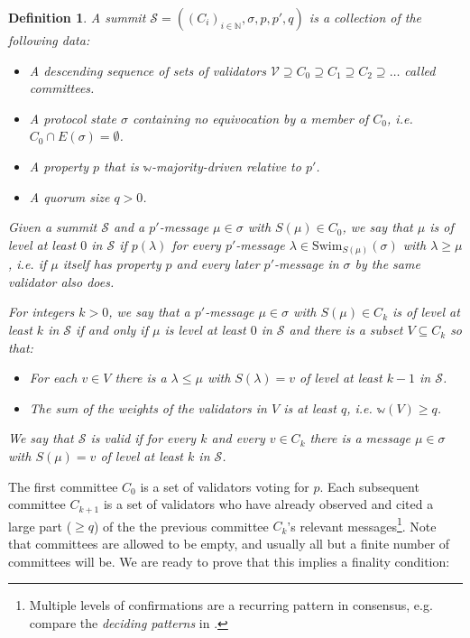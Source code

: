 \documentclass[12pt]{article}
\newtheorem{definition}{Definition}
\begin{document}
\begin{definition}
A \emph{summit} $\mathcal{S}=((C_i)_{i \in \mathbb{N}}, \sigma, p, p', q)$ is a collection of the following data:
\begin{itemize}
  \item A descending sequence of sets of validators $\mathcal{V} \supseteq C_0 \supseteq C_1 \supseteq C_2 \supseteq \ldots $ called \emph{committees}.
\item A protocol state $\sigma$ containing no equivocation by a member of $C_0$, i.e. $C_0 \cap E(\sigma) = \emptyset$.
\item A property $p$ that is $\mathbb{w}$-majority-driven relative to $p'$.
\item A quorum size $q > 0$.
\end{itemize}

  Given a summit $\mathcal{S}$ and a $p'$-message $\mu \in \sigma$ with $S(\mu) \in C_0$, we say that $\mu$ is of \emph{level at least $0$ in $\mathcal{S}$} if $p(\lambda)$ for every $p'$-message $\lambda \in \mathrm{Swim}_{S(\mu)}(\sigma)$ with $\lambda \geq \mu$, i.e. if $\mu$ itself has property $p$ and every later $p'$-message in $\sigma$ by the same validator also does.

For integers $k > 0$, we say that a $p'$-message $\mu \in \sigma$ with $S(\mu) \in C_k$ is of \emph{level at least $k$ in $\mathcal{S}$} if and only if $\mu$ is level at least $0$ in $\mathcal{S}$ and there is a subset $V\subseteq C_k$ so that:
\begin{itemize}
  \item For each $v\in V$ there is a $\lambda \leq \mu$ with $S(\lambda) = v$ of level at least $k-1$ in $\mathcal{S}$.
\item The sum of the weights of the validators in $V$ is at least $q$, i.e. $\mathbb{w}(V) \geq q$.
\end{itemize}

  We say that $\mathcal{S}$ is \emph{valid} if for every $k$ and every $v\in C_k$ there is a message $\mu \in \sigma$ with $S(\mu) = v$ of level at least $k$ in $\mathcal{S}$.
\end{definition}

The first committee $C_0$ is a set of validators voting for $p$. Each subsequent committee $C_{k+1}$ is a set of validators who have already observed and cited a large part ($\geq q$) of the the previous committee $C_k$'s relevant messages\footnote{Multiple levels of confirmations are a recurring pattern in consensus, e.g. compare the \emph{deciding patterns} in \cite{moser1999byzantine}.}. Note that committees are allowed to be empty, and usually all but a finite number of committees will be.
We are ready to prove that this implies a finality condition:
\end{document}
